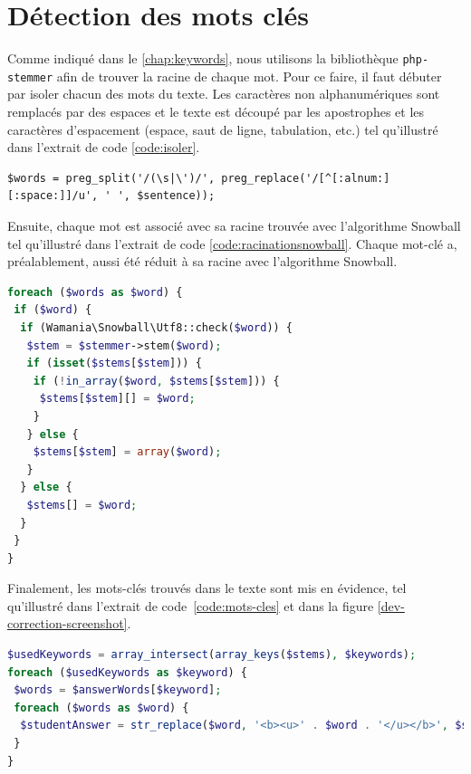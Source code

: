 \section{D\'etection des mots cl\'es}
Comme indiqu\'e dans le \autoref{chap:keywords}, nous utilisons la biblioth\`eque \texttt{php-stemmer} afin de trouver la racine de chaque mot.
Pour ce faire, il faut d\'ebuter par isoler chacun des mots du texte.
Les caract\`eres non alphanum\'eriques sont remplac\'es par des espaces et le texte est d\'ecoup\'e par les apostrophes et les caract\`eres d'espacement (espace, saut de ligne, tabulation, etc.) tel qu'illustr\'e dans l'extrait de code \ref{code:isoler}.
\begin{lstfloat}[htbp]
\begin{lstlisting}[frame=l]
$words = preg_split('/(\s|\')/', preg_replace('/[^[:alnum:][:space:]]/u', ' ', $sentence));
\end{lstlisting}
\caption{Isoler les mots du texte.}
\label{code:isoler}
\end{lstfloat}
Ensuite, chaque mot est associ\'e avec sa racine trouv\'ee avec l'algorithme Snowball tel qu'illustr\'e dans l'extrait de code \ref{code:racinationsnowball}.
Chaque mot-cl\'e a, pr\'ealablement, aussi \'et\'e r\'eduit \`a sa racine avec l'algorithme Snowball.
\begin{lstfloat}[htbp]
\begin{lstlisting}[language=php,frame=l]
foreach ($words as $word) {
 if ($word) {
  if (Wamania\Snowball\Utf8::check($word)) {
   $stem = $stemmer->stem($word);
   if (isset($stems[$stem])) {
    if (!in_array($word, $stems[$stem])) {
     $stems[$stem][] = $word;
    }
   } else {
    $stems[$stem] = array($word);
   }
  } else {
   $stems[] = $word;
  }
 }
}
\end{lstlisting}
\caption{Racination des mots avec Snowball.}
\label{code:racinationsnowball}
\end{lstfloat}
Finalement, les mots-cl\'es trouv\'es dans le texte sont mis en \'evidence, tel qu'illustr\'e dans l'extrait de code~\ref{code:mots-cles} et dans la figure \ref{dev-correction-screenshot}.
\begin{lstfloat}[htbp]
\begin{lstlisting}[language=php,frame=l]
$usedKeywords = array_intersect(array_keys($stems), $keywords);
foreach ($usedKeywords as $keyword) {
 $words = $answerWords[$keyword];
 foreach ($words as $word) {
  $studentAnswer = str_replace($word, '<b><u>' . $word . '</u></b>', $studentAnswer);
 }
}
\end{lstlisting}
\caption{Mise en \'evidence des mots-cl\'es trouv\'es.}
\label{code:mots-cles}
\end{lstfloat}
